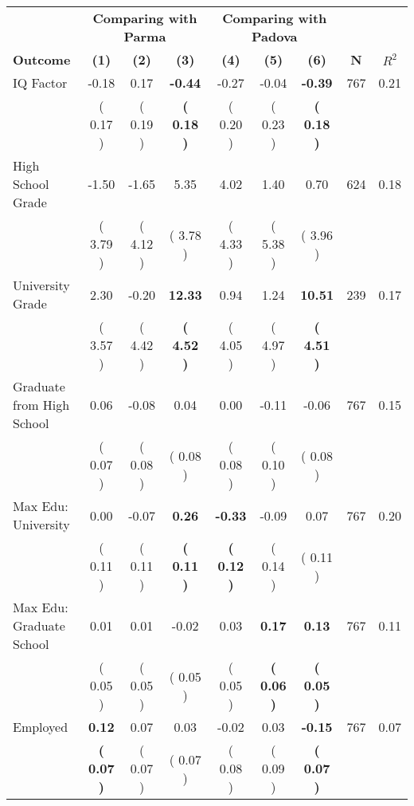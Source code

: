 \begin{tabular}{lcccccccc}
\toprule
 & \multicolumn{3}{c}{\textbf{Comparing with Parma}} & \multicolumn{3}{c}{\textbf{Comparing with Padova}} & \\
\cmidrule(lr){2-4} \cmidrule(lr){5-7} 
 \textbf{Outcome} & \textbf{(1)} & \textbf{(2)} & \textbf{(3)} & \textbf{(4)} & \textbf{(5)} & \textbf{(6)} & \textbf{N} & \textbf{$ R^2$} \\
\midrule
IQ Factor &     -0.18 &      0.17 & \textbf{    -0.44} &     -0.27 &     -0.04 & \textbf{    -0.39} & 767 &       0.21 \\ 
 & (     0.17 ) & (     0.19 ) & \textbf{(     0.18 )} & (     0.20 ) & (     0.23 ) & \textbf{(     0.18 )} & \\
High School Grade &     -1.50 &     -1.65 &      5.35 &      4.02 &      1.40 &      0.70 & 624 &       0.18 \\ 
 & (     3.79 ) & (     4.12 ) & (     3.78 ) & (     4.33 ) & (     5.38 ) & (     3.96 ) & \\
University Grade &      2.30 &     -0.20 & \textbf{    12.33} &      0.94 &      1.24 & \textbf{    10.51} & 239 &       0.17 \\ 
 & (     3.57 ) & (     4.42 ) & \textbf{(     4.52 )} & (     4.05 ) & (     4.97 ) & \textbf{(     4.51 )} & \\
Graduate from High School &      0.06 &     -0.08 &      0.04 &      0.00 &     -0.11 &     -0.06 & 767 &       0.15 \\ 
 & (     0.07 ) & (     0.08 ) & (     0.08 ) & (     0.08 ) & (     0.10 ) & (     0.08 ) & \\
Max Edu: University &      0.00 &     -0.07 & \textbf{     0.26} & \textbf{    -0.33} &     -0.09 &      0.07 & 767 &       0.20 \\ 
 & (     0.11 ) & (     0.11 ) & \textbf{(     0.11 )} & \textbf{(     0.12 )} & (     0.14 ) & (     0.11 ) & \\
Max Edu: Graduate School &      0.01 &      0.01 &     -0.02 &      0.03 & \textbf{     0.17} & \textbf{     0.13} & 767 &       0.11 \\ 
 & (     0.05 ) & (     0.05 ) & (     0.05 ) & (     0.05 ) & \textbf{(     0.06 )} & \textbf{(     0.05 )} & \\
Employed & \textbf{     0.12} &      0.07 &      0.03 &     -0.02 &      0.03 & \textbf{    -0.15} & 767 &       0.07 \\ 
 & \textbf{(     0.07 )} & (     0.07 ) & (     0.07 ) & (     0.08 ) & (     0.09 ) & \textbf{(     0.07 )} & \\

\end{tabular}
